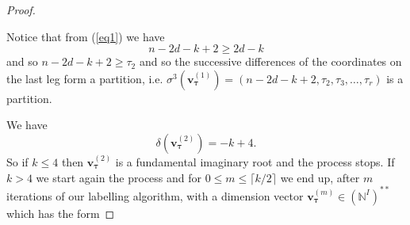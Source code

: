 \documentclass[11pt]{article}
\theoremstyle{definition}
\numberwithin{equation}{section}
\newcommand{\bv}{{\mathbf{v}}}
\newcommand{\N}{{\mathbb{N}}}
\newcommand{\tauhat}{{\boldsymbol \tau}}
\begin{document}
\begin{proof}
\begin{center}
	\end{center}
	
	
	Notice that from (\ref{eq1}) we have
	$$
	n-2d-k+2\geq 2d-k
	$$
	and so $n-2d-k+2\geq \tau_2$ and so the successive differences of the coordinates on the last leg form a partition, i.e. $\sigma^3(\bv^{(1)}_\tauhat)=(n-2d-k+2,\tau_2,\tau_3,\ldots , \tau_r)$ is a partition.
	
	We have
	$$
	\delta(\bv^{(2)}_\tauhat)=-k+4.
	$$
	So if $k\leq 4$ then $\bv^{(2)}_\tauhat$ is a fundamental imaginary root and the process stops. If $k>4$ we start again the process and for $0\leq m\leq \lceil k/2\rceil$ we end up, after $m$ iterations of our labelling algorithm,  with a dimension vector $\bv_\tauhat^{(m)}\in(\N^I)^{**}$ which has the form
	

\end{proof}
\end{document}
